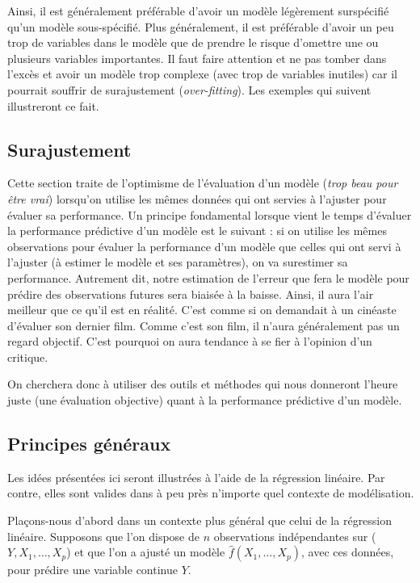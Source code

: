 \documentclass[
  11pt,
  letterpaper,
]{book}
\theoremstyle{definition}
\theoremstyle{remark}
\begin{document}
Ainsi, il est généralement préférable d'avoir un modèle légèrement
surspécifié qu'un modèle sous-spécifié. Plus généralement, il est
préférable d'avoir un peu trop de variables dans le modèle que de
prendre le risque d'omettre une ou plusieurs variables importantes. Il
faut faire attention et ne pas tomber dans l'excès et avoir un modèle
trop complexe (avec trop de variables inutiles) car il pourrait souffrir
de surajustement (\emph{over-fitting}). Les exemples qui suivent
illustreront ce fait.

\hypertarget{surajustement}{%
\subsection{Surajustement}\label{surajustement}}

Cette section traite de l'optimisme de l'évaluation d'un modèle
(\emph{trop beau pour être vrai}) lorsqu'on utilise les mêmes données
qui ont servies à l'ajuster pour évaluer sa performance. Un principe
fondamental lorsque vient le temps d'évaluer la performance prédictive
d'un modèle est le suivant : si on utilise les mêmes observations pour
évaluer la performance d'un modèle que celles qui ont servi à l'ajuster
(à estimer le modèle et ses paramètres), on va surestimer sa
performance. Autrement dit, notre estimation de l'erreur que fera le
modèle pour prédire des observations futures sera biaisée à la baisse.
Ainsi, il aura l'air meilleur que ce qu'il est en réalité. C'est comme
si on demandait à un cinéaste d'évaluer son dernier film. Comme c'est
son film, il n'aura généralement pas un regard objectif. C'est pourquoi
on aura tendance à se fier à l'opinion d'un critique.

On cherchera donc à utiliser des outils et méthodes qui nous donneront
l'heure juste (une évaluation objective) quant à la performance
prédictive d'un modèle.

\hypertarget{principes-guxe9nuxe9raux}{%
\subsection{Principes généraux}\label{principes-guxe9nuxe9raux}}

Les idées présentées ici seront illustrées à l'aide de la régression
linéaire. Par contre, elles sont valides dans à peu près n'importe quel
contexte de modélisation.

Plaçons-nous d'abord dans un contexte plus général que celui de la
régression linéaire. Supposons que l'on dispose de \(n\) observations
indépendantes sur (\(Y, X_1, \ldots, X_p\)) et que l'on a ajusté un
modèle \(\widehat{f}(X_1, \ldots, X_p)\), avec ces données, pour prédire
une variable continue \(Y\).
\end{document}
